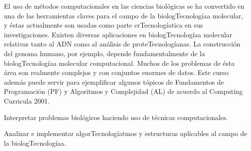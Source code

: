 \begin{syllabus}


\begin{justification}
El uso de métodos computacionales en las ciencias biológicas
se ha convertido en una de las herramientas claves para el
campo de la biologTecnologíaa molecular, y éstas actualmente son usadas
como parte crTecnologíatica en sus investigaciones. Existen diversas
aplicaciones en biologTecnologíaa molecular relativas tanto al ADN como
al análisis de proteTecnologíanas. La construcción del genoma humano,
por ejemplo, depende fundamentalmente de la biologTecnologíaa molecular
computacional. Muchos de los problemas de ésta área son realmente
complejos y con conjuntos enormes de datos. Este curso además
puede servir para ejemplificar algunos tópicos de Fundamentos
de Programación (PF) y Algoritmos y Complejidad (AL) de
acuerdo al Computing Curricula 2001.
\end{justification}

\begin{goals}
\item Interpretar problemas biológicos haciendo uso de técnicas computacionales.
\item Analizar e implementar algorTecnologíatmos y estructuras aplicables al campo de la biologTecnologíaa.
\end{goals}

\begin{outcomes}
\end{outcomes}


\end{syllabus}
